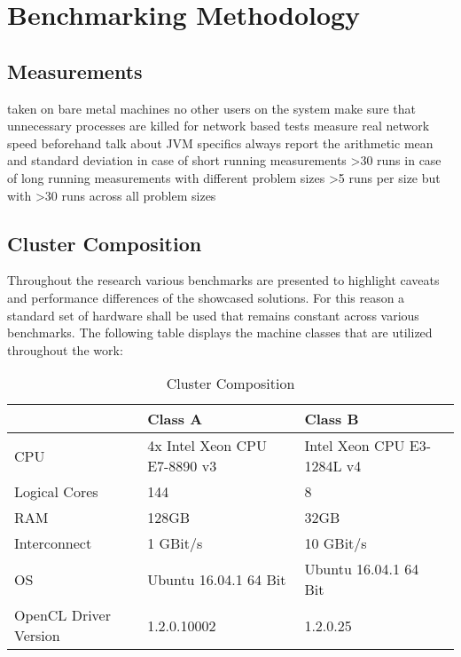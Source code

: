 \chapter{Benchmarking Methodology}
\label{benchmarking_methodology}
\section{Measurements}

taken on bare metal machines
no other users on the system
make sure that unnecessary processes are killed
for network based tests measure real network speed beforehand
talk about JVM specifics
always report the arithmetic mean and standard deviation
in case of short running measurements >30 runs
in case of long running measurements with different problem sizes >5 runs per size but with >30 runs across all problem sizes

\section{Cluster Composition}
\label{cluster_composition}
Throughout the research various benchmarks are presented to highlight caveats and performance differences of the showcased solutions. For this reason a standard set of hardware shall be used that remains constant across various benchmarks. The following table displays the machine classes that are utilized throughout the work:

\begin{table}[htb]
	\centering
	\begin{adjustbox}{width=1\textwidth}
		\small
		\begin{tabular}{l | l | l | l}
			~                     & Class A                  	& Class B                  \\
			\hline
			CPU                   &  4x Intel Xeon CPU E7-8890 v3 	& Intel Xeon CPU E3-1284L v4 \\
			Logical Cores         &  144 	& 8 \\
			RAM                   &  128GB                       	& 32GB                       \\
			Interconnect          &  1 GBit/s                  	& 10 GBit/s                  \\
			OS                    &  Ubuntu 16.04.1 64 Bit      	& Ubuntu 16.04.1 64 Bit      \\
			OpenCL Driver Version &  1.2.0.10002                   & 1.2.0.25                   \\
		\end{tabular}
	\end{adjustbox}
	
	\caption{Cluster Composition}
	\label{table:cluster_setup_1}
\end{table}

